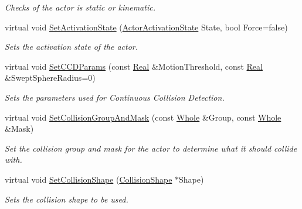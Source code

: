 \begin{DoxyCompactItemize}
\begin{DoxyCompactList}\small\item\em Checks of the actor is static or kinematic. \item\end{DoxyCompactList}\item 
virtual void \hyperlink{classphys_1_1ActorBasePhysicsSettings_ab0b1760f3730e85470097d44985a5b56}{SetActivationState} (\hyperlink{namespacephys_a7d434b1a52cf5290a9ecc972b87a6a40}{ActorActivationState} State, bool Force=false)
\begin{DoxyCompactList}\small\item\em Sets the activation state of the actor. \item\end{DoxyCompactList}\item 
virtual void \hyperlink{classphys_1_1ActorBasePhysicsSettings_a1ad9104e006156c21a8f304eb371d0e0}{SetCCDParams} (const \hyperlink{namespacephys_af7eb897198d265b8e868f45240230d5f}{Real} \&MotionThreshold, const \hyperlink{namespacephys_af7eb897198d265b8e868f45240230d5f}{Real} \&SweptSphereRadius=0)
\begin{DoxyCompactList}\small\item\em Sets the parameters used for Continuous Collision Detection. \item\end{DoxyCompactList}\item 
virtual void \hyperlink{classphys_1_1ActorBasePhysicsSettings_a992771e73cd1f98628618cf75938a5ef}{SetCollisionGroupAndMask} (const \hyperlink{namespacephys_a460f6bc24c8dd347b05e0366ae34f34a}{Whole} \&Group, const \hyperlink{namespacephys_a460f6bc24c8dd347b05e0366ae34f34a}{Whole} \&Mask)
\begin{DoxyCompactList}\small\item\em Set the collision group and mask for the actor to determine what it should collide with. \item\end{DoxyCompactList}\item 
virtual void \hyperlink{classphys_1_1ActorBasePhysicsSettings_a1509c654724bcb6499ec1e5058ab5185}{SetCollisionShape} (\hyperlink{classphys_1_1CollisionShape}{CollisionShape} $\ast$Shape)
\begin{DoxyCompactList}\small\item\em Sets the collision shape to be used. \item\end{DoxyCompactList}\item 

\end{DoxyCompactItemize}
